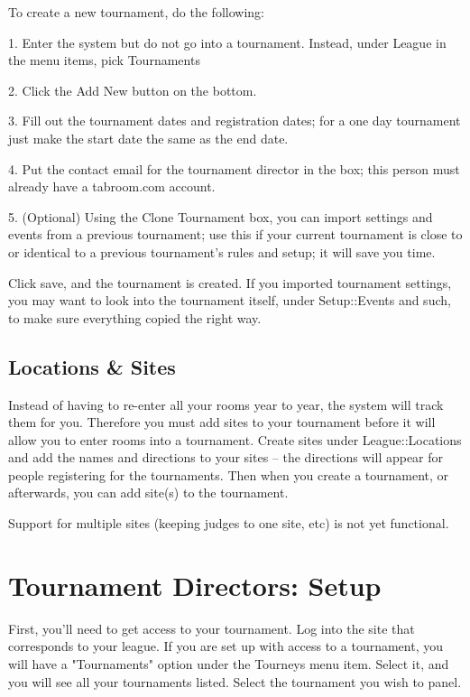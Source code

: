 \documentclass[12pt]{report} \usepackage {fullpage} \usepackage{times}
\begin{document}
\medskip

To create a new tournament, do the following:

1.  Enter the system but do not go into a tournament.  Instead, under
League in the menu items, pick Tournaments

2.  Click the Add New button on the bottom.

3.  Fill out the tournament dates and registration dates; for a one day
tournament just make the start date the same as the end date.

4.  Put the contact email for the tournament director in the box; this
person must already have a tabroom.com account.

5.  (Optional) Using the Clone Tournament box, you can import settings
and events from a previous tournament; use this if your current tournament
is close to or identical to a previous tournament's rules and setup; it
will save you time. 

Click save, and the tournament is created.  If you imported tournament
settings, you may want to look into the tournament itself, under
Setup::Events and such, to make sure everything copied the right way.

\section{Locations \& Sites}

Instead of having to re-enter all your rooms year to year, the system will
track them for you.  Therefore you must add sites to your tournament before
it will allow you to enter rooms into a tournament.  Create sites under
League::Locations and add the names and directions to your sites -- the
directions will appear for people registering for the tournaments.  Then
when you create a tournament, or afterwards, you can add site(s) to the
tournament.

Support for multiple sites (keeping judges to one site, etc) is not yet
functional.


\chapter{Tournament Directors: Setup}

First, you'll need to get access to your tournament.   Log into the site
that corresponds to your league.  If you are set up with access to a
tournament, you will have a "Tournaments" option under the Tourneys menu
item.  Select it, and you will see all your tournaments listed.  Select the
tournament you wish to panel. 
\end{document}
